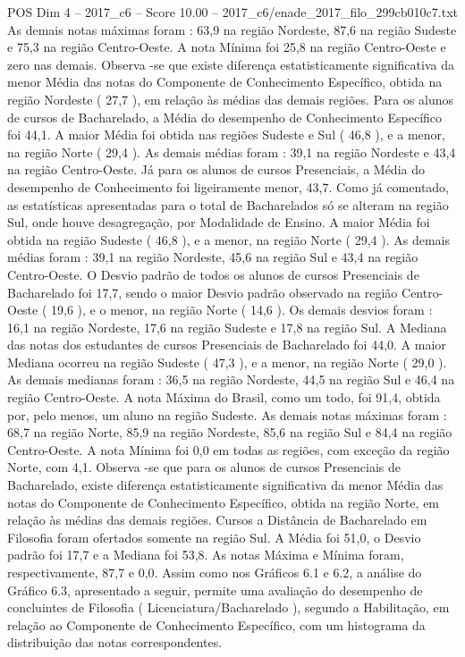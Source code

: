 \begin{textsample}{POS Dim 4 – 2017\_c6 – Score 10.00 – 2017\_c6/enade\_2017\_filo\_299cb010c7.txt}
As demais notas máximas foram : 63,9 na região Nordeste, 87,6 na região Sudeste e 75,3 na região Centro-Oeste.
A nota Mínima foi 25,8 na região Centro-Oeste e zero nas demais.
Observa -se que existe diferença estatisticamente significativa da menor Média das notas do Componente de Conhecimento Específico, obtida na região Nordeste ( 27,7 ), em relação às médias das demais regiões.
Para os alunos de cursos de Bacharelado, a Média do desempenho de Conhecimento Específico foi 44,1.
A maior Média foi obtida nas regiões Sudeste e Sul ( 46,8 ), e a menor, na região Norte ( 29,4 ).
As demais médias foram : 39,1 na região Nordeste e 43,4 na região Centro-Oeste.
Já para os alunos de cursos Presenciais, a Média do desempenho de Conhecimento foi ligeiramente menor, 43,7.
Como já comentado, as estatísticas apresentadas para o total de Bacharelados só se alteram na região Sul, onde houve desagregação, por Modalidade de Ensino.
A maior Média foi obtida na região Sudeste ( 46,8 ), e a menor, na região Norte ( 29,4 ).
As demais médias foram : 39,1 na região Nordeste, 45,6 na região Sul e 43,4 na região Centro-Oeste.
O Desvio padrão de todos os alunos de cursos Presenciais de Bacharelado foi 17,7, sendo o maior Desvio padrão observado na região Centro-Oeste ( 19,6 ), e o menor, na região Norte ( 14,6 ).
Os demais desvios foram : 16,1 na região Nordeste, 17,6 na região Sudeste e 17,8 na região Sul.
A Mediana das notas dos estudantes de cursos Presenciais de Bacharelado foi 44,0.
A maior Mediana ocorreu na região Sudeste ( 47,3 ), e a menor, na região Norte ( 29,0 ).
As demais medianas foram : 36,5 na região Nordeste, 44,5 na região Sul e 46,4 na região Centro-Oeste.
A nota Máxima do Brasil, como um todo, foi 91,4, obtida por, pelo menos, um aluno na região Sudeste.
As demais notas máximas foram : 68,7 na região Norte, 85,9 na região Nordeste, 85,6 na região Sul e 84,4 na região Centro-Oeste.
A nota Mínima foi 0,0 em todas as regiões, com exceção da região Norte, com 4,1.
Observa -se que para os alunos de cursos Presenciais de Bacharelado, existe diferença estatisticamente significativa da menor Média das notas do Componente de Conhecimento Específico, obtida na região Norte, em relação às médias das demais regiões.
Cursos a Distância de Bacharelado em Filosofia foram ofertados somente na região Sul.
A Média foi 51,0, o Desvio padrão foi 17,7 e a Mediana foi 53,8.
As notas Máxima e Mínima foram, respectivamente, 87,7 e 0,0.
Assim como nos Gráficos 6.1 e 6.2, a análise do Gráfico 6.3, apresentado a seguir, permite uma avaliação do desempenho de concluintes de Filosofia ( Licenciatura/Bacharelado ), segundo a Habilitação, em relação ao Componente de Conhecimento Específico, com um histograma da distribuição das notas correspondentes.

\end{textsample}
